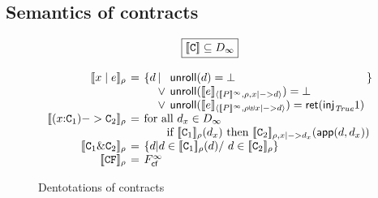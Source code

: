 


\subsection{Semantics of contracts}


\begin{figure}
$$
\setlength{\arraycolsep}{2pt}
\begin{array}{rcl}
\multicolumn{3}{c}{
\ruleform{\dbrace{\Ct} \subseteq D_{\infty}} }
\\ \\
\dbrace{x \mid e}_\rho 
 & = & \{d \begin{array}[t]{ll} \mid & \unroll(d) = \bot \\
                  \lor & \unroll(\interp{e}{\dbrace{P}^\infty}{\rho,x|->d}) = \bot \\
                  \lor & \unroll(\interp{e}{\dbrace{P}^\infty}{\rho \uplus x|->d}) = \ret(\inj{\True} 1)
             \end{array} \}
\\
\dbrace{(x{:}\Ct_1) -> \Ct_2}_{\rho} 
 & = & \text{for all } d_x \in D_\infty \\ 
    &&   \quad\quad \text{if }
                     \dbrace{\Ct_1}_\rho(d_x)\text{ then }
                     \dbrace{\Ct_2}_{\rho,x|->d_x}(\dapp(d,d_x)) 
\\
\dbrace{\Ct_1 \& \Ct_2}_\rho 
 & = & \{ d | d \in \dbrace{\Ct_1}_\rho(d) /\ d \in \dbrace{\Ct_2}_\rho \}
\\
\dbrace{\CF}_\rho & = &  \Fcf^{\infty} 
\end{array}
$$
\caption{Dentotations of contracts} \label{f:den-sem-contracts}
\end{figure}

